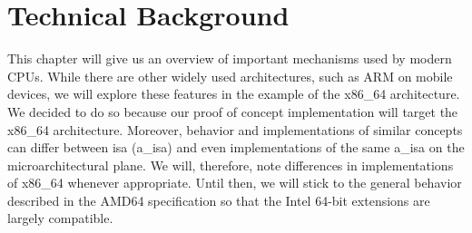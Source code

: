 \section{Technical Background}
\label{sec:state:technical}
This chapter will give us an overview of important mechanisms used by modern
CPUs. While there are other widely used architectures, such as ARM on
mobile devices, we will explore these features in the example of the x86\_64
architecture. \\

We decided to do so because our proof of concept implementation will target
the x86\_64 architecture. Moreover, behavior and implementations of similar
concepts can differ between \gls{isa} (\acrshort{a_isa}) and even
implementations of the same \acrshort{a_isa} on the microarchitectural plane.
We will, therefore, note differences in implementations of x86\_64 whenever
appropriate. Until then, we will stick to the general behavior described in
the AMD64 specification so that the Intel 64-bit extensions are largely
compatible.
